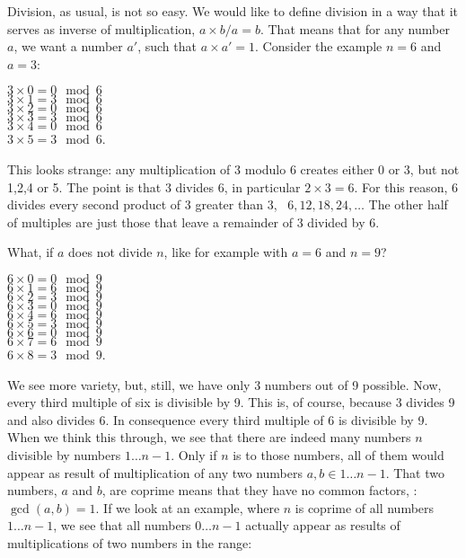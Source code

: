 \documentclass{scrreprt}
\begin{document}
Division, as usual, is not so easy.
We would like to define division in a way
that it serves as inverse of multiplication,
\eg\: $a \times b / a = b$. That means
that for any number $a$, we want a number $a'$, such that
$a \times a' = 1$. 
Consider the example $n = 6$ and $a = 3$:

$3 \times 0 = 0 \mod 6$\\
$3 \times 1 = 3 \mod 6$\\
$3 \times 2 = 0 \mod 6$\\
$3 \times 3 = 3 \mod 6$\\
$3 \times 4 = 0 \mod 6$\\
$3 \times 5 = 3 \mod 6$.

This looks strange: any multiplication of 3 modulo 6
creates either 0 or 3, but not 1,2,4 or 5.
The point is that 3 divides 6, in particular $2 \times 3 = 6$.
For this reason, 6 divides every second product of 3 
greater than 3, \ie\ $6, 12, 18, 24, \dots$
The other half of multiples are just those
that leave a remainder of 3 divided by 6.

What, if $a$ does not divide $n$, like for example
with $a = 6$ and $n=9$?

$6 \times 0 = 0 \mod 9$\\
$6 \times 1 = 6 \mod 9$\\
$6 \times 2 = 3 \mod 9$\\
$6 \times 3 = 0 \mod 9$\\
$6 \times 4 = 6 \mod 9$\\
$6 \times 5 = 3 \mod 9$\\
$6 \times 6 = 0 \mod 9$\\
$6 \times 7 = 6 \mod 9$\\
$6 \times 8 = 3 \mod 9$.

We see more variety, but, still, we have only
3 numbers out of 9 possible.
Now, every third multiple of six is divisible by 9.
This is, of course, because 3 divides 9 and
also divides 6. In consequence every third multiple
of 6 is divisible by 9.
When we think this through, we see that there are indeed
many numbers $n$ divisible by numbers $1\dots n-1$.
Only if $n$ is  to those numbers,
all of them would appear as result
of multiplication of any two numbers 
$a,b \in 1\dots n-1$.
That two numbers, $a$ and $b$, are coprime means
that they have no common factors, 
\ie: $\gcd(a,b) = 1$.
If we look at an example,
where $n$ is coprime of all numbers $1\dots n-1$,
we see that all numbers $0\dots n-1$ actually
appear as results of multiplications of two
numbers in the range:
\end{document}
